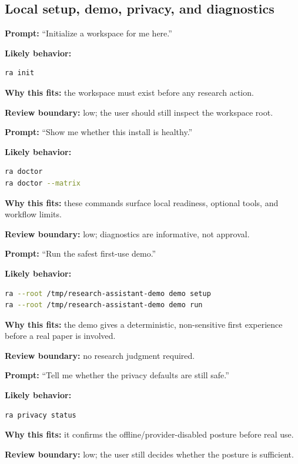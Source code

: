 \documentclass[11pt,a4paper,openany]{book}
\begin{document}
\subsection{Local setup, demo, privacy, and diagnostics}

\textbf{Prompt:} ``Initialize a workspace for me here.''

\textbf{Likely behavior:}
\begin{lstlisting}[language=bash]
ra init
\end{lstlisting}

\textbf{Why this fits:} the workspace must exist before any research action.

\textbf{Review boundary:} low; the user should still inspect the workspace root.

\textbf{Prompt:} ``Show me whether this install is healthy.''

\textbf{Likely behavior:}
\begin{lstlisting}[language=bash]
ra doctor
ra doctor --matrix
\end{lstlisting}

\textbf{Why this fits:} these commands surface local readiness, optional tools,
and workflow limits.

\textbf{Review boundary:} low; diagnostics are informative, not approval.

\textbf{Prompt:} ``Run the safest first-use demo.''

\textbf{Likely behavior:}
\begin{lstlisting}[language=bash]
ra --root /tmp/research-assistant-demo demo setup
ra --root /tmp/research-assistant-demo demo run
\end{lstlisting}

\textbf{Why this fits:} the demo gives a deterministic, non-sensitive first
experience before a real paper is involved.

\textbf{Review boundary:} no research judgment required.

\textbf{Prompt:} ``Tell me whether the privacy defaults are still safe.''

\textbf{Likely behavior:}
\begin{lstlisting}[language=bash]
ra privacy status
\end{lstlisting}

\textbf{Why this fits:} it confirms the offline/provider-disabled posture before
real use.

\textbf{Review boundary:} low; the user still decides whether the posture is
sufficient.
\end{document}
